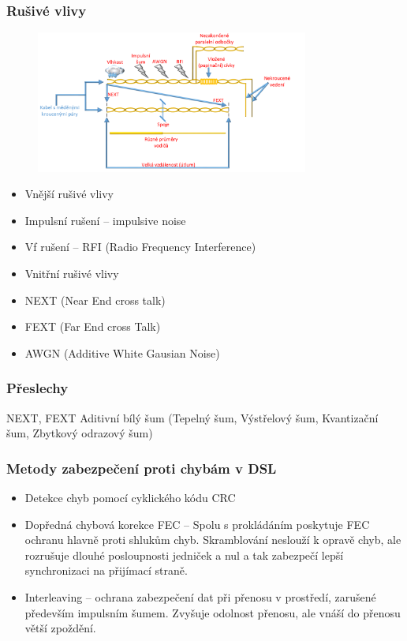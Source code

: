 \subsubsection{Rušivé vlivy}
\begin{figure} [h]
    \centering
    \includegraphics[width=0.8\textwidth]{snimky/ADSL ruch.png}
    \label{fig:adsl-ruch}
\end{figure}
\begin{itemize}
    \item Vnější rušivé vlivy
    \item Impulsní rušení -- impulsive noise
    \item Vf rušení -- RFI (Radio Frequency Interference)
    \item Vnitřní rušivé vlivy
    \item NEXT (Near End cross talk)
    \item FEXT (Far End cross Talk)
    \item AWGN (Additive White Gausian Noise)
\end{itemize}

\subsubsection{Přeslechy}
NEXT, FEXT
Aditivní bílý šum (Tepelný šum, Výstřelový šum, Kvantizační šum, Zbytkový odrazový šum)


\subsubsection{Metody zabezpečení proti chybám v DSL}
\begin{itemize}
    \item Detekce chyb pomocí cyklického kódu CRC
    \item Dopředná chybová korekce FEC -- Spolu s prokládáním poskytuje FEC ochranu hlavně proti shlukům chyb. Skramblování neslouží k opravě chyb, ale rozrušuje dlouhé posloupnosti jedniček a nul a tak zabezpečí lepší synchronizaci na přijímací straně.
    \item Interleaving -- ochrana zabezpečení dat při přenosu v prostředí, zarušené především impulsním šumem. Zvyšuje odolnost přenosu, ale vnáší do přenosu větší zpoždění.
\end{itemize}


